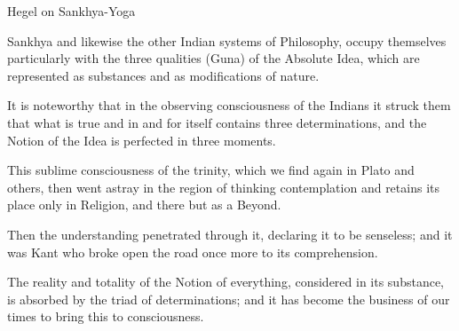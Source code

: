 Hegel on Sankhya-Yoga

Sankhya and likewise the other Indian systems of Philosophy,
occupy themselves particularly with the three qualities (Guna)
of the Absolute Idea, which are represented as substances
and as modifications of nature.

It is noteworthy that in the observing consciousness of the Indians
it struck them that what is true and in and for itself
contains three determinations,
and the Notion of the Idea is perfected in three moments.

This sublime consciousness of the trinity,
which we find again in Plato and others,
then went astray in the region of thinking contemplation
and retains its place only in Religion,
and there but as a Beyond.

Then the understanding penetrated through it,
declaring it to be senseless;
and it was Kant who broke open the road once more
to its comprehension.

The reality and totality of the Notion of everything,
considered in its substance, is absorbed by
the triad of determinations;
and it has become the business of our times
to bring this to consciousness.
